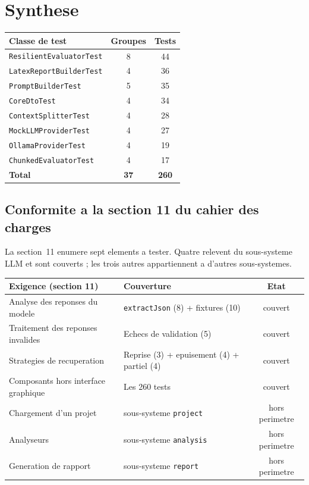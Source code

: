 \documentclass[12pt,a4paper]{article}
\begin{document}
\section{Synthese}

\begin{center}
\begin{tabular}{lcc}
\toprule
\textbf{Classe de test} & \textbf{Groupes} & \textbf{Tests} \\
\midrule
\texttt{ResilientEvaluatorTest} & 8 & 44 \\
\texttt{LatexReportBuilderTest}  & 4 & 36 \\
\texttt{PromptBuilderTest}      & 5 & 35 \\
\texttt{CoreDtoTest}            & 4 & 34 \\
\texttt{ContextSplitterTest}    & 4 & 28 \\
\texttt{MockLLMProviderTest}    & 4 & 27 \\
\texttt{OllamaProviderTest}     & 4 & 19 \\
\texttt{ChunkedEvaluatorTest}   & 4 & 17 \\
\midrule
\textbf{Total} & \textbf{37} & \textbf{260} \\
\bottomrule
\end{tabular}
\end{center}

\subsection{Conformite a la section 11 du cahier des charges}

La section~11 enumere sept elements a tester. Quatre relevent du sous-systeme LLM
et sont couverts ; les trois autres appartiennent a d'autres sous-systemes.

\begin{center}
\begin{tabular}{llc}
\toprule
\textbf{Exigence (section 11)} & \textbf{Couverture} & \textbf{Etat} \\
\midrule
Analyse des reponses du modele  & \texttt{extractJson} (8) + fixtures (10) & couvert \\
Traitement des reponses invalides & Echecs de validation (5) & couvert \\
Strategies de recuperation      & Reprise (3) + epuisement (4) + partiel (4) & couvert \\
Composants hors interface graphique & Les 260 tests & couvert \\
\midrule
Chargement d'un projet          & sous-systeme \texttt{project} & hors perimetre \\
Analyseurs                      & sous-systeme \texttt{analysis} & hors perimetre \\
Generation de rapport           & sous-systeme \texttt{report} & hors perimetre \\
\bottomrule
\end{tabular}
\end{center}
\end{document}
